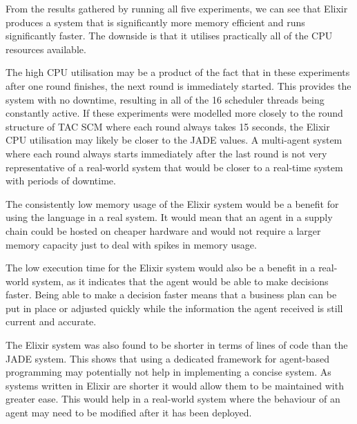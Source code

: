 From the results gathered by running all five experiments, we can see that Elixir produces a system that is significantly more memory efficient and runs significantly faster.
The downside is that it utilises practically all of the CPU resources available.

The high CPU utilisation may be a product of the fact that in these experiments after one round finishes, the next round is immediately started.
This provides the system with no downtime, resulting in all of the 16 scheduler threads being constantly active.
If these experiments were modelled more closely to the round structure of TAC SCM where each round always takes 15 seconds, the Elixir CPU utilisation may likely be closer to the JADE values.
A multi-agent system where each round always starts immediately after the last round is not very representative of a real-world system that would be closer to a real-time system with periods of downtime.

The consistently low memory usage of the Elixir system would be a benefit for using the language in a real system.
It would mean that an agent in a supply chain could be hosted on cheaper hardware and would not require a larger memory capacity just to deal with spikes in memory usage.

The low execution time for the Elixir system would also be a benefit in a real-world system, as it indicates that the agent would be able to make decisions faster.
Being able to make a decision faster means that a business plan can be put in place or adjusted quickly while the information the agent received is still current and accurate.

The Elixir system was also found to be shorter in terms of lines of code than the JADE system.
This shows that using a dedicated framework for agent-based programming may potentially not help in implementing a concise system.
As systems written in Elixir are shorter it would allow them to be maintained with greater ease.
This would help in a real-world system where the behaviour of an agent may need to be modified after it has been deployed.
